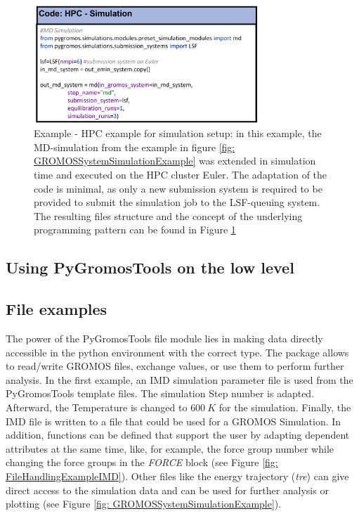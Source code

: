 \begin{figure}[h]
    \centering
    \includegraphics[width=0.75\textwidth]{fig/ApplicationExamples/codeExample_GROMOSSystemHPCSimulation.png}
    \caption{Example - HPC example for simulation setup: in this example, the MD-simulation from the example in figure \ref{fig: GROMOSSystemSimulationExample} was extended in simulation time and executed on the HPC cluster Euler. The adaptation of the code is minimal, as only a new submission system is required to be provided to submit the simulation job to the LSF-queuing system. The resulting files structure and the concept of the underlying programming pattern can be found in Figure \ref{fig: GROMOSSystemSimulationHPCExample}}
    \label{fig: GROMOSSystemSimulationHPCExample}
\end{figure}


\subsection{Using PyGromosTools on the low level}

\subsection{File examples}
The power of the PyGromosTools file module lies in making data directly accessible in the python environment with the correct type. The package allows to read/write GROMOS files, exchange values, or use them to perform further analysis. In the first example, an IMD simulation parameter file is used from the PyGromosTools template files. The simulation Step number is adapted. Afterward, the Temperature is changed to $600~K$ for the simulation. Finally, the IMD file is written to a file that could be used for a GROMOS Simulation.  In addition, functions can be defined that support the user by adapting dependent attributes at the same time, like, for example, the force group number while changing the force groups in the \textit{FORCE} block (see Figure \ref{fig: FileHandlingExampleIMD}). Other files like the energy trajectory (\textit{tre}) can give direct access to the simulation data and can be used for further analysis or plotting (see Figure \ref{fig: GROMOSSystemSimulationExample}).

